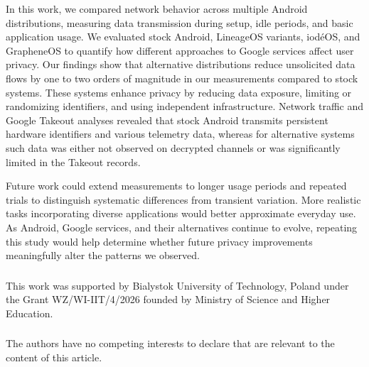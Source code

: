 \documentclass[runningheads]{llncs}
\begin{document}
In this work, we compared network behavior across multiple Android distributions, measuring data transmission during setup, idle periods, and basic application usage. We evaluated stock Android, LineageOS variants, iod\'eOS, and GrapheneOS to quantify how different approaches to Google services affect user privacy. Our findings show that alternative distributions reduce unsolicited data flows by one to two orders of magnitude in our measurements compared to stock systems. These systems enhance privacy by reducing data exposure, limiting or randomizing identifiers, and using independent infrastructure. Network traffic and Google Takeout analyses revealed that stock Android transmits persistent hardware identifiers and various telemetry data, whereas for alternative systems such data was either not observed on decrypted channels or was significantly limited in the Takeout records.

Future work could extend measurements to longer usage periods and repeated trials to distinguish systematic differences from transient variation. More realistic tasks incorporating diverse applications would better approximate everyday use. As Android, Google services, and their alternatives continue to evolve, repeating this study would help determine whether future privacy improvements meaningfully alter the patterns we observed.

\begin{credits}
	\subsubsection{\ackname}
	This work was supported by Bialystok University of Technology, Poland under the Grant WZ/WI-IIT/4/2026 founded by Ministry of Science and Higher Education.
	
	\subsubsection{\discintname}
	The authors have no competing interests to declare that are
	relevant to the content of this article. 
\end{credits}



\end{document}
